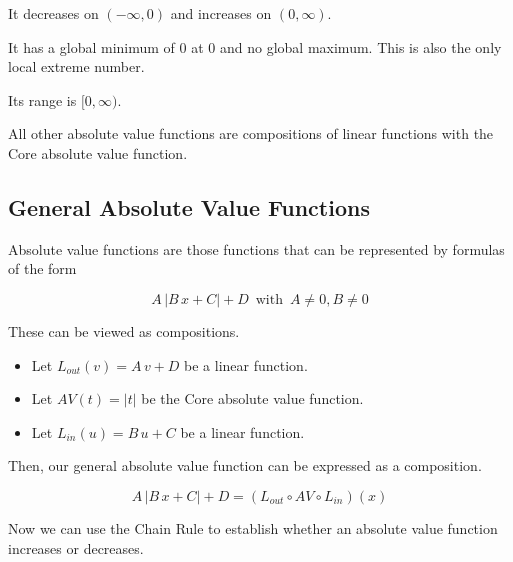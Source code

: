 \documentclass{ximera}
\begin{document}
It decreases on $(-\infty, 0)$ and increases on $(0, \infty)$.

It has a global minimum of $0$ at $0$ and no global maximum.  This is also the only local extreme number.

Its range is $[0, \infty)$.



All other absolute value functions are compositions of linear functions with the Core absolute value function.












\subsection*{General Absolute Value Functions}

Absolute value functions are those functions that can be represented by formulas of the form


\[
A \, |B \, x + C| + D  \, \text{ with }  \, A \ne 0, B \ne 0
\]



These can be viewed as compositions.




\begin{itemize}
\item Let $L_{out}(v) = A \, v + D$ be a linear function.
\item Let $AV(t) = |t|$ be the Core absolute value function.
\item Let $L_{in}(u) = B \, u + C$ be a linear function.
\end{itemize}

Then, our general absolute value function can be expressed as a composition.


\[
 A \, |B \, x + C| + D = (L_{out} \circ AV \circ L_{in})(x)
\]



Now we can use the Chain Rule to establish whether an absolute value function increases or decreases.
\end{document}
